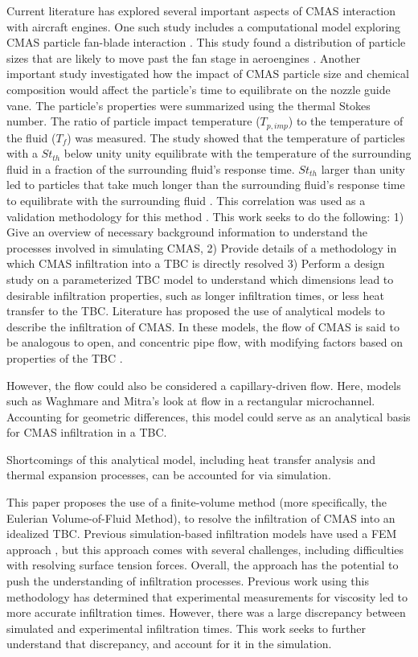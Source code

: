 \documentclass[conf]{new-aiaa}
\begin{document}
Current literature has explored several important aspects of CMAS interaction with aircraft engines. One such study includes a computational model exploring CMAS particle fan-blade interaction \cite{Vogel2018}. This study found a distribution of particle sizes that are likely to move past the fan stage in aeroengines \cite{Vogel2018}. Another important study investigated how the impact of CMAS particle size and chemical composition would affect the particle’s time to equilibrate on the nozzle guide vane. The particle’s properties were summarized using the thermal Stokes number. The ratio of particle impact temperature ($T_{p,imp}$) to the temperature of the fluid ($T_f$) was measured. The study showed that the temperature of particles with a $St_{th}$ below unity unity equilibrate with the temperature of the surrounding fluid in a fraction of the surrounding fluid’s response time. $St_{th}$ larger than unity led to particles that take much longer than the surrounding fluid’s response time to equilibrate with the surrounding fluid \cite{Bojdo2019}. This correlation was used as a validation methodology for this method \cite{Cavainolo2022}.
This work seeks to do the following: 1) Give an overview of necessary background information to understand the processes involved in simulating CMAS, 2) Provide details of a methodology in which CMAS infiltration into a TBC is directly resolved 3) Perform a design study on a parameterized TBC model to understand which dimensions lead to desirable infiltration properties, such as longer infiltration times, or less heat transfer to the TBC. Literature has proposed the use of analytical models to describe the infiltration of CMAS. In these models, the flow of CMAS is said to be analogous to open, and concentric pipe flow, with modifying factors based on properties of the TBC \cite{Naraparaju2017}. 

However, the flow could also be considered a capillary-driven flow. Here, models such as Waghmare and Mitra's \cite{WAGHMARE2010c, WAGHMARE2010117, WAGHMARE2010561} look at flow in a rectangular microchannel. Accounting for geometric differences, this model could serve as an analytical basis for CMAS infiltration in a TBC.

Shortcomings of this analytical model, including heat transfer analysis and thermal expansion processes, can be accounted for via simulation. 

This paper proposes the use of a finite-volume method (more specifically, the Eulerian Volume-of-Fluid Method), to resolve the infiltration of CMAS into an idealized TBC. Previous simulation-based infiltration models have used a FEM approach \cite{Sirigiri2018}, but this approach comes with several challenges, including difficulties with  resolving surface tension forces. Overall, the approach has the potential to push the understanding of infiltration processes. Previous work using this methodology has determined that experimental measurements for viscosity led to more accurate infiltration times. However, there was a large discrepancy between simulated and experimental infiltration times. This work seeks to further understand that discrepancy, and account for it in the simulation.
\end{document}
